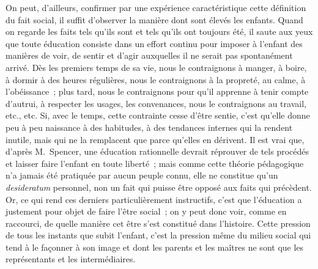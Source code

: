 \documentclass[french,twoside]{book} %
\begin{document}
On peut, d’ailleurs, confirmer par une expérience caractéristique cette définition du fait social, il suffit d’observer la manière dont sont élevés les enfants. Quand on regarde les faits tels qu’ils sont et tels qu’ils ont toujours été, il saute aux yeux que toute éducation consiste dans un effort continu pour imposer à l’enfant des manières de voir, de sentir et d’agir auxquelles il ne serait pas spontanément arrivé. Dès les premiers temps de sa vie, nous le contraignons à manger, à boire, à dormir à des heures régulières, nous le contraignons à la propreté, au calme, à l’obéissance ; plus tard, nous le contraignons pour qu’il apprenne à tenir compte d’autrui, à respecter les usages, les convenances, nous le contraignons au travail, etc., etc. Si, avec le temps, cette contrainte cesse d’être sentie, c’est qu’elle donne peu à peu naissance à des habitudes, à des tendances internes qui la rendent inutile, mais qui ne la remplacent que parce qu’elles en dérivent. Il est vrai que, d’après M. Spencer, une éducation rationnelle devrait réprouver de tels procédés et laisser faire l’enfant en toute liberté ; mais comme cette théorie pédagogique n’a jamais été pratiquée par aucun peuple connu, elle ne constitue qu’un {\itshape desideratum} personnel, non un fait qui puisse être opposé aux faits qui précèdent. Or, ce qui rend ces derniers particulièrement instructifs, c’est que l’éducation a justement pour objet de faire l’être social ; on y peut donc voir, comme en raccourci, de quelle manière cet être s’est constitué dans l’histoire. Cette pression de tous les instants que subit l’enfant, c’est la pression même du milieu social qui tend à le façonner à son image et dont les parents et les maîtres ne sont que les représentants et les intermédiaires.\par
\end{document}
